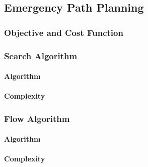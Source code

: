 \subsection{Emergency Path Planning}

\subsubsection{Objective and Cost Function}

\subsubsection{Search Algorithm}
\paragraph{Algorithm}
\paragraph{Complexity}

\subsubsection{Flow Algorithm}
\paragraph{Algorithm}
\paragraph{Complexity}
